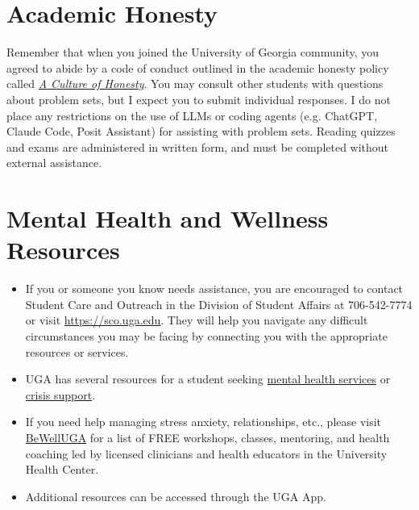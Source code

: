 \documentclass[11pt, letterpaper]{article}
\begin{document}
\section*{Academic Honesty}
Remember that when you joined the University of Georgia community, you agreed to abide by a code of conduct outlined in the academic honesty policy called \href{https://honesty.uga.edu/Academic-Honesty-Policy/Introduction/}{\textit{A Culture of Honesty}}. You may consult other students with questions about problem sets, but I expect you to submit individual responses. I do not place any restrictions on the use of LLMs or coding agents (e.g. ChatGPT, Claude Code, Posit Assistant) for assisting with problem sets. Reading quizzes and exams are administered in written form, and must be completed without external assistance.

\section*{Mental Health and Wellness Resources}

\begin{itemize}
\item If you or someone you know needs assistance, you are encouraged to contact Student Care and Outreach in the Division of Student Affairs at 706-542-7774 or visit \href{https://sco.uga.edu}{https://sco.uga.edu}. They will help you navigate any difficult circumstances you may be facing by connecting you with the appropriate resources or services.
\item UGA has several resources for a student seeking \href{https://www.uhs.uga.edu/bewelluga/bewelluga}{mental health services} or \href{https://www.uhs.uga.edu/info/emergencies}{crisis support}.
\item If you need help managing stress anxiety, relationships, etc., please visit \href{https://www.uhs.uga.edu/bewelluga/bewelluga}{BeWellUGA} for a list of FREE workshops, classes, mentoring, and health coaching led by licensed clinicians and health educators in the University Health Center.
\item Additional resources can be accessed through the UGA App.
\end{itemize}



\end{document}
